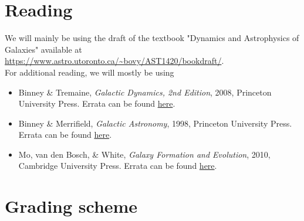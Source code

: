 \documentclass{article}
\begin{document}
\section*{Reading}

We will mainly be using the draft of the textbook "Dynamics and Astrophysics of Galaxies"
available at \url{https://www.astro.utoronto.ca/~bovy/AST1420/bookdraft/}.\\[5pt]

For additional reading, we will mostly be using

\begin{itemize}

  \item Binney \& Tremaine, \emph{Galactic Dynamics, 2nd Edition},
    2008, Princeton University Press. Errata can be found
    \href{https://www-thphys.physics.ox.ac.uk/people/JamesBinney/web/index\_files/BT2errors.pdf}{here}.

  \item Binney \& Merrifield, \emph{Galactic Astronomy},
    1998, Princeton University Press. Errata can be found
    \href{http://www-thphys.physics.ox.ac.uk/people/JamesBinney/bmerrors.pdf}{here}.

  \item Mo, van den Bosch, \& White, \emph{Galaxy Formation and Evolution},
    2010, Cambridge University Press. Errata can be found
    \href{http://people.umass.edu/hjmo/book/errata.pdf}{here}.

\end{itemize}

\section*{Grading scheme}
\end{document}
